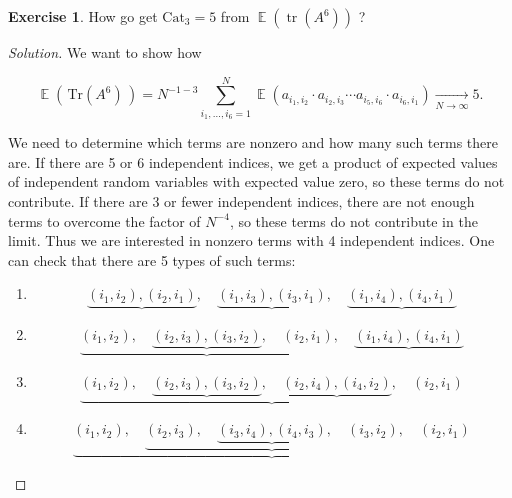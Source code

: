\documentclass[letterpaper,11pt,oneside,reqno]{amsart}
\numberwithin{equation}{section}
\DeclareMathOperator{\EE}{\mathbb{E}}
\theoremstyle{definition}
\newtheorem{exercise}[proposition]{Exercise}
\begin{document}
\begin{exercise}
How go get $ \mathrm{Cat}_3 = 5 $ from $ \EE(\mathop{\mathrm{tr}}( A^6 ) )$ ?
\end{exercise}
\begin{proof}[Solution]
	We want to show how

	\begin{equation*}
	\EE( \, \text{Tr}( A^6 ) \, ) = N^{ -1 - 3 } \sum_{ i_1 , \ldots, i_6 = 1 }^N \EE \left( a_{ i_1, i_2 } \cdot a_{ i_2, i_3 } \cdots a_{ i_5, i_6 } \cdot a_{ i_6, i_1 } \right) \xrightarrow[ N \to \infty ]{} 5.
	\end{equation*}

	We need to determine which terms are nonzero and how many such terms there are.  If there are 5 or 6 independent indices, we get a product of expected values of independent random variables with expected value zero, so these terms do not contribute.  If there are 3 or fewer independent indices, there are not enough terms to overcome the factor of $ N^{ -4 } $, so these terms do not contribute in the limit.  Thus we are interested in nonzero terms with 4 independent indices.
	One can check that there are 5 types of such terms:

	\begin{enumerate}

	\item
	\begin{equation*}
	\underbrace{ ( i_1, i_2 ) , ( i_2 , i_1 ) }, \quad \underbrace{ ( i_1, i_3 ) , ( i_3, i_1 ) }, \quad \underbrace{ ( i_1, i_4 ), ( i_4, i_1 ) }
	\end{equation*}

	\item
	\begin{equation*}
	\underbrace{ ( i_1, i_2 ) , \quad \underbrace{ ( i_2 , i_3 ) , ( i_3, i_2 ) } , \quad ( i_2, i_1 ) } , \quad \underbrace{ ( i_1, i_4 ), ( i_4, i_1 ) }
	\end{equation*}

	\item
	\begin{equation*}
	\underbrace{ ( i_1, i_2 ) , \quad \underbrace{ ( i_2 , i_3 ) , ( i_3, i_2 ) } , \quad \underbrace{ ( i_2, i_4 ) , ( i_4, i_2 ) }, \quad ( i_2, i_1 ) } 
	\end{equation*}

	\item
	\begin{equation*}
	\underbrace{ ( i_1, i_2 ) , \quad \underbrace{ ( i_2 , i_3 ) , \quad \underbrace{ ( i_3, i_4 ) , ( i_4, i_3 ) }, \quad ( i_3, i_2 ) } , \quad ( i_2, i_1 ) } 
	\end{equation*}


\end{enumerate}
\end{proof}
\end{document}
